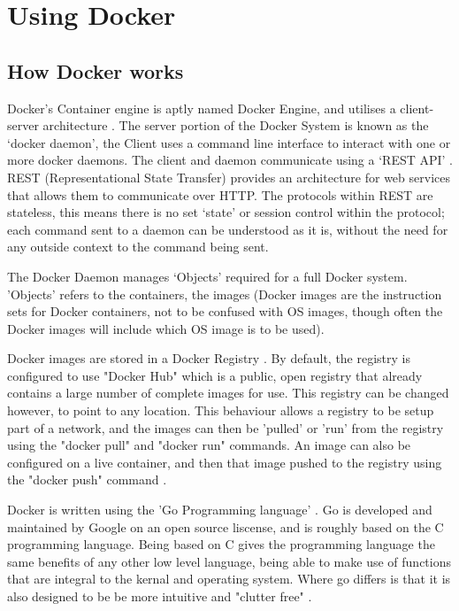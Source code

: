 \section{Using Docker}
\subsection{How Docker works}
\label{subsec:docker}
Docker's Container engine is aptly named Docker Engine, and utilises a client-server architecture \citep[Section: Docker architecture]{DockerOverview}. The server portion of the Docker System is known as the `docker daemon', the Client uses a command line interface to interact with one or more docker daemons. The client and daemon communicate using a `REST API' \citep[Section: The Docker daemon]{DockerOverview}. REST (Representational State Transfer) provides an architecture for web services \citep{W3Architecture2004} that allows them to communicate over HTTP. The protocols within REST are stateless, this means there is no set `state' or session control within the protocol; each command sent to a daemon can be understood as it is, without the need for any outside context to the command being sent.

The Docker Daemon manages `Objects' \citep[Section: Docker objects]{DockerOverview} required for a full Docker system. 'Objects' refers to the containers, the images (Docker images are the instruction sets for Docker containers, not to be confused with OS images, though often the Docker images will include which OS image is to be used).

Docker images are stored in a Docker Registry \citep[Section: Docker registries]{DockerOverview}. By default, the registry is configured to use "Docker Hub" which is a public, open registry that already contains a large number of complete images for use. This registry can be changed however, to point to any location. This behaviour allows a registry to be setup part of a network, and the images can then be 'pulled' or 'run' from the registry using the "docker pull" and "docker run" commands\citep[Section: Docker registries]{DockerOverview}. An image can also be configured on a live container, and then that image pushed to the registry using the "docker push" command \citep[Section: Docker registries]{DockerOverview}.


Docker is written using the 'Go Programming language' \citep[Section: The underlying technology]{DockerOverview}. Go is developed and maintained by Google on an open source liscense, and is roughly based on the C programming language\citep{GoAncestors}. Being based on C gives the programming language the same benefits of any other low level language, being able to make use of functions that are integral to the kernal and operating system. Where go differs is that it is also designed to be be more intuitive and "clutter free" \citep{GoPrinciples}.


